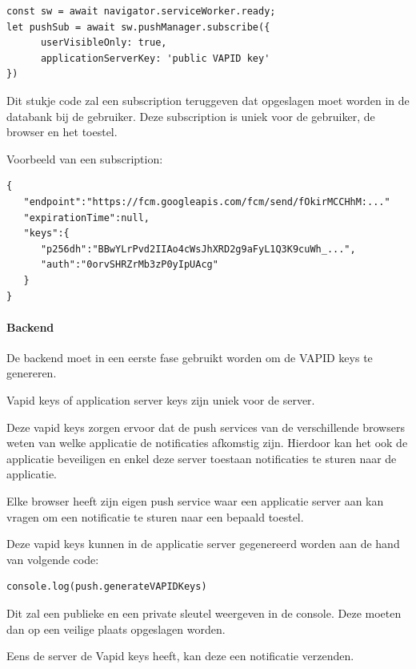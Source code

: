 \begin{lstlisting}
const sw = await navigator.serviceWorker.ready;
let pushSub = await sw.pushManager.subscribe({
      userVisibleOnly: true,
      applicationServerKey: 'public VAPID key'
})
\end{lstlisting}

			Dit stukje code zal een subscription teruggeven dat opgeslagen moet worden in de databank bij de gebruiker. Deze subscription is uniek voor de gebruiker, de browser en het toestel.
			\autocite{Gaunt2019a}
	
\newpage
			Voorbeeld van een subscription:
	
\begin{lstlisting}
{
   "endpoint":"https://fcm.googleapis.com/fcm/send/fOkirMCCHhM:..."
   "expirationTime":null,
   "keys":{
      "p256dh":"BBwYLrPvd2IIAo4cWsJhXRD2g9aFyL1Q3K9cuWh_...",
      "auth":"0orvSHRZrMb3zP0yIpUAcg"
   }
}
\end{lstlisting}


		\paragraph{Backend}
			De backend moet in een eerste fase gebruikt worden om de VAPID keys te genereren.
			
			Vapid keys of application server keys zijn uniek voor de server.
			
			Deze vapid keys zorgen ervoor dat de push services van de verschillende browsers weten van welke applicatie de notificaties afkomstig zijn. Hierdoor kan het ook de applicatie beveiligen en enkel deze server toestaan notificaties te sturen naar de applicatie.
			
			Elke browser heeft zijn eigen push service waar een applicatie server aan kan vragen om een notificatie te sturen naar een bepaald toestel.
			\autocite{Gaunt2020}
			
			Deze vapid keys kunnen in de applicatie server gegenereerd worden aan de hand van volgende code:
			
\begin{lstlisting}
console.log(push.generateVAPIDKeys)
\end{lstlisting}

			Dit zal een publieke en een private sleutel weergeven in de console. Deze moeten dan op een veilige plaats opgeslagen worden.
			
			Eens de server de Vapid keys heeft, kan deze een notificatie verzenden.
			

